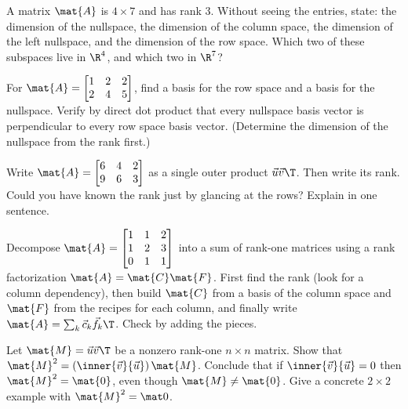 \begin{exercise}\label{ch16:ex-rn-predict}
A matrix $\mat{A}$ is $4\times 7$ and has rank $3$. Without seeing the entries,
state: the dimension of the nullspace, the dimension of the column space, the
dimension of the left nullspace, and the dimension of the row space. Which two of
these subspaces live in $\R^4$, and which two in $\R^7$?
\end{exercise}

\begin{exercise}\label{ch16:ex-perp}
For $\mat{A}=\begin{bmatrix} 1 & 2 & 2 \\ 2 & 4 & 5 \end{bmatrix}$, find a basis
for the row space and a basis for the nullspace. Verify by direct dot product
that every nullspace basis vector is perpendicular to every row space basis
vector. (Determine the dimension of the nullspace from the rank first.)
\end{exercise}

\begin{exercise}\label{ch16:ex-outer}
Write $\mat{A}=\begin{bmatrix} 6 & 4 & 2 \\ 9 & 6 & 3 \end{bmatrix}$ as a single
outer product $\vec{u}\vec{v}\T$. Then write its rank. Could you have known the
rank just by glancing at the rows? Explain in one sentence.
\end{exercise}

\begin{exercise}\label{ch16:ex-sum}
Decompose $\mat{A}=\begin{bmatrix} 1 & 1 & 2 \\ 1 & 2 & 3 \\ 0 & 1 & 1 \end{bmatrix}$
into a sum of rank-one matrices using a rank factorization $\mat{A}=\mat{C}\mat{F}$.
First find the rank (look for a column dependency), then build $\mat{C}$ from a
basis of the column space and $\mat{F}$ from the recipes for each column, and
finally write $\mat{A}=\sum_k \vec{c}_k\vec{f}_k\T$. Check by adding the pieces.
\end{exercise}

\begin{exercise}\label{ch16:ex-rankone-property}
Let $\mat{M}=\vec{u}\vec{v}\T$ be a nonzero rank-one $n\times n$ matrix. Show that
$\mat{M}^2 = (\inner{\vec v}{\vec u})\,\mat{M}$. Conclude that if
$\inner{\vec v}{\vec u}=0$ then $\mat{M}^2 = \mat{0}$, even though
$\mat{M}\ne\mat{0}$. Give a concrete $2\times 2$ example with $\mat{M}^2=\mat0$.
\end{exercise}


